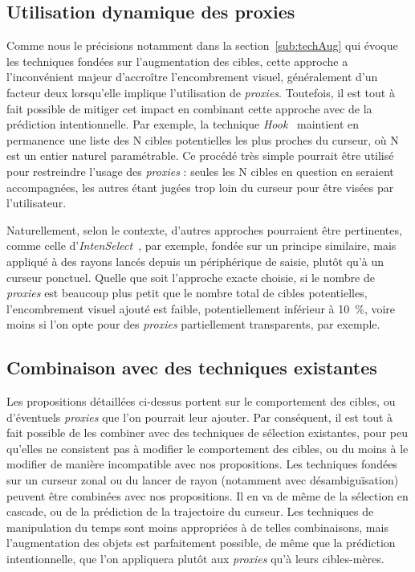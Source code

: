 	
	\subsection{Utilisation dynamique des proxies}
	\label{sub:dynamicProxies}
	Comme nous le précisions notamment dans la section~\ref{sub:techAug} qui évoque les techniques fondées sur l'augmentation des cibles, cette approche a l'inconvénient majeur d'accroître l'encombrement visuel, généralement d'un facteur deux lorsqu'elle implique l'utilisation de \emph{proxies}. Toutefois, il est tout à fait possible de mitiger cet impact en combinant cette approche avec de la prédiction intentionnelle. Par exemple, la technique \emph{Hook}~\cite{ortega2013hook} maintient en permanence une liste des N cibles potentielles les plus proches du curseur, où N est un entier naturel paramétrable. Ce procédé très simple pourrait être utilisé pour restreindre l'usage des \emph{proxies} : seules les N cibles en question en seraient accompagnées, les autres étant jugées trop loin du curseur pour être visées par l'utilisateur.
	
	Naturellement, selon le contexte, d'autres approches pourraient être pertinentes, comme celle d'\emph{IntenSelect}~\cite{de2005intenselect}, par exemple, fondée sur un principe similaire, mais appliqué à des rayons lancés depuis un périphérique de saisie, plutôt qu'à un curseur ponctuel. Quelle que soit l'approche exacte choisie, si le nombre de \emph{proxies} est beaucoup plus petit que le nombre total de cibles potentielles, l'encombrement visuel ajouté est faible, potentiellement inférieur à 10~\%{}, voire moins si l'on opte pour des \emph{proxies} partiellement transparents, par exemple.

	\subsection{Combinaison avec des techniques existantes}
	Les propositions détaillées ci-dessus portent sur le comportement des cibles, ou d'éventuels \emph{proxies} que l'on pourrait leur ajouter. Par conséquent, il est tout à fait possible de les combiner avec des techniques de sélection existantes, pour peu qu'elles ne consistent pas à modifier le comportement des cibles, ou du moins à le modifier de manière incompatible avec nos propositions. Les techniques fondées sur un curseur zonal ou du lancer de rayon (notamment avec désambiguïsation) peuvent être combinées avec nos propositions. Il en va de même de la sélection en cascade, ou de la prédiction de la trajectoire du curseur. Les techniques de manipulation du temps sont moins appropriées à de telles combinaisons, mais l'augmentation des objets est parfaitement possible, de même que la prédiction intentionnelle, que l'on appliquera plutôt aux \emph{proxies} qu'à leurs cibles-mères.
	
